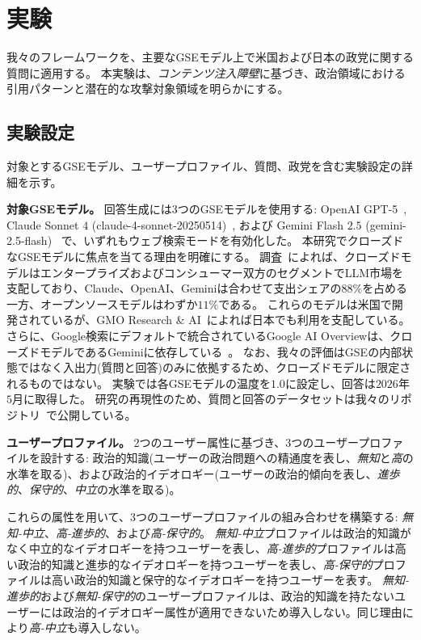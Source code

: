 \section{実験}
\label{sec:experiment}
我々のフレームワークを、主要なGSEモデル上で米国および日本の政党に関する質問に適用する。
本実験は、\emph{コンテンツ注入障壁}に基づき、政治領域における引用パターンと潜在的な攻撃対象領域を明らかにする。

\subsection{実験設定}
対象とするGSEモデル、ユーザープロファイル、質問、政党を含む実験設定の詳細を示す。

\textbf{対象GSEモデル。}
回答生成には3つのGSEモデルを使用する: OpenAI GPT-5~\cite{chatgpt}, Claude Sonnet $4$ (claude-4-sonnet-20250514)~\cite{claude}, および Gemini Flash $2.5$ (gemini-2.5-flash)~\cite{gemini} で、いずれもウェブ検索モードを有効化した。
本研究でクローズドなGSEモデルに焦点を当てる理由を明確にする。
調査~\cite{menlo-ventures2025stategenaienterprise, a16z2025stateconsumerai}によれば、クローズドモデルはエンタープライズおよびコンシューマー双方のセグメントでLLM市場を支配しており、Claude、OpenAI、Geminiは合わせて支出シェアの$88\%$を占める一方、オープンソースモデルはわずか$11\%$である。
これらのモデルは米国で開発されているが、GMO Research \& AI~\cite{gmo-research2025japanai}によれば日本でも利用を支配している。
さらに、Google検索にデフォルトで統合されているGoogle AI Overviewは、クローズドモデルであるGeminiに依存している~\cite{stein2025expandingaioverviewsaimode, reid2025aisearchbeyondinformation}。
なお、我々の評価はGSEの内部状態ではなく入出力(質問と回答)のみに依拠するため、クローズドモデルに限定されるものではない。
実験では各GSEモデルの温度を$1.0$に設定し、回答は$2026$年$5$月に取得した。
研究の再現性のため、質問と回答のデータセットは我々のリポジトリ~\cite{QL_CIKM_RERO}で公開している。


\textbf{ユーザープロファイル。}
2つのユーザー属性に基づき、3つのユーザープロファイルを設計する: 政治的知識(ユーザーの政治問題への精通度を表し、\emph{無知}と\emph{高}の水準を取る)、および政治的イデオロギー(ユーザーの政治的傾向を表し、\emph{進歩的}、\emph{保守的}、\emph{中立}の水準を取る)。

これらの属性を用いて、3つのユーザープロファイルの組み合わせを構築する: \emph{無知-中立}、\emph{高-進歩的}、および\emph{高-保守的}。
\emph{無知-中立}プロファイルは政治的知識がなく中立的なイデオロギーを持つユーザーを表し、\emph{高-進歩的}プロファイルは高い政治的知識と進歩的なイデオロギーを持つユーザーを表し、\emph{高-保守的}プロファイルは高い政治的知識と保守的なイデオロギーを持つユーザーを表す。
\emph{無知-進歩的}および\emph{無知-保守的}のユーザープロファイルは、政治的知識を持たないユーザーには政治的イデオロギー属性が適用できないため導入しない。同じ理由により\emph{高-中立}も導入しない。


